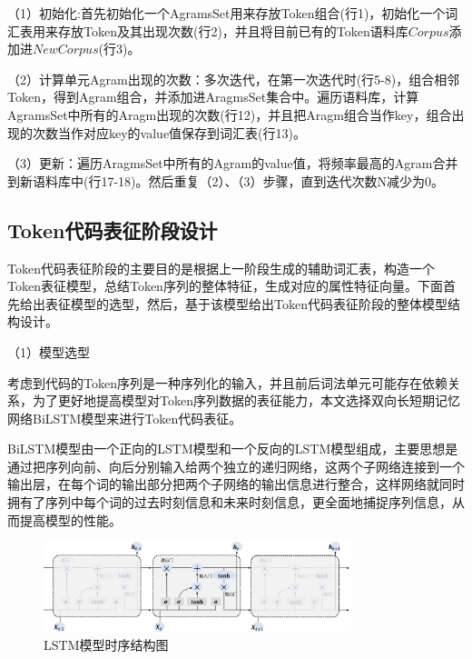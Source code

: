 （1）初始化:首先初始化一个AgramsSet用来存放Token组合(行1)，初始化一个词汇表用来存放Token及其出现次数(行2)，并且将目前已有的Token语料库$Corpus$添加进$NewCorpus$(行3)。

（2）计算单元Agram出现的次数：多次迭代，在第一次迭代时(行5-8)，组合相邻Token，得到Agram组合，并添加进AragmsSet集合中。遍历语料库，计算AgramsSet中所有的Aragm出现的次数(行12)，并且把Aragm组合当作key，组合出现的次数当作对应key的value值保存到词汇表(行13)。

（3）更新：遍历AragmsSet中所有的Agram的value值，将频率最高的Agram合并到新语料库中(行17-18)。然后重复（2）、（3）步骤，直到迭代次数N减少为0。

\subsection{Token代码表征阶段设计}
\label{subsec:TokenModel}

Token代码表征阶段的主要目的是根据上一阶段生成的辅助词汇表，构造一个Token表征模型，总结Token序列的整体特征，生成对应的属性特征向量。下面首先给出表征模型的选型，然后，基于该模型给出Token代码表征阶段的整体模型结构设计。

（1）模型选型

考虑到代码的Token序列是一种序列化的输入，并且前后词法单元可能存在依赖关系，为了更好地提高模型对Token序列数据的表征能力，本文选择双向长短期记忆网络BiLSTM模型来进行Token代码表征。

BiLSTM模型由一个正向的LSTM模型和一个反向的LSTM模型组成，主要思想是通过把序列向前、向后分别输入给两个独立的递归网络，这两个子网络连接到一个输出层，在每个词的输出部分把两个子网络的输出信息进行整合，这样网络就同时拥有了序列中每个词的过去时刻信息和未来时刻信息，更全面地捕捉序列信息，从而提高模型的性能。

\begin{figure}[htp]
  \centering
  \includegraphics[width=0.8\textwidth]{figures/LSTM}
  \caption{LSTM模型时序结构图}\label{fig:LSTM}
\end{figure}

